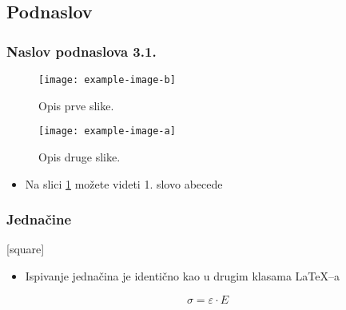 \documentclass{beamer} %
\begin{document}
\subsection{Podnaslov}
\begin{frame}
    \frametitle{Naslov podnaslova 3.1.}

\begin{figure} %
   \begin{minipage}[b]{0.45\linewidth}
            \centering
            \texttt{[image: example-image-b]} 
            \caption{Opis prve slike.}
            \label{fig:prva_slika} %
        \end{minipage}
        \hspace{0.5cm}
        \begin{minipage}[b]{0.45\linewidth}
            \centering
            \texttt{[image: example-image-a]} 
            \caption{Opis druge slike.}
            \label{fig:druga_slika}
    \end{minipage}
\end{figure}  

\begin{itemize}
    \item Na slici \ref{fig:druga_slika} možete videti 1. slovo abecede
\end{itemize}
  
\end{frame}
\begin{frame}
\frametitle{Jednačine} %
[square]
 \begin{itemize}
     \item Ispivanje jednačina je identično kao u drugim klasama \LaTeX--a 
     \vspace{0.1cm}
 \end{itemize}
 \begin{equation}
     \sigma = \varepsilon \cdot E
 \end{equation}

 
\end{frame}
\end{document}
